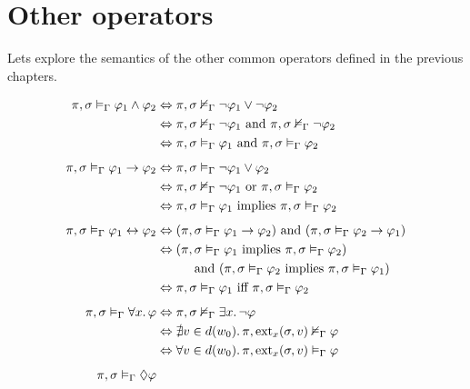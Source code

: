 \section{Other operators}
Lets explore the semantics of the other common operators defined in the previous chapters.

\begin{align}
  \sem{\pi}{\sigma}{\Gamma}{\phi_1 \land \phi_2}
    &\Leftrightarrow \semn{\pi}{\sigma}{\Gamma}{\neg\phi_1 \lor \neg\phi_2} \notag \\
    &\Leftrightarrow \semn{\pi}{\sigma}{\Gamma}{\neg\phi_1} \text{ and } \semn{\pi}{\sigma}{\Gamma}{\neg\phi_2} \notag \\
    &\Leftrightarrow \sem{\pi}{\sigma}{\Gamma}{\phi_1} \text{ and } \sem{\pi}{\sigma}{\Gamma}{\phi_2} \label{eq:andsem} \\[1ex]
  \sem{\pi}{\sigma}{\Gamma}{\phi_1 \to \phi_2}
    &\Leftrightarrow \sem{\pi}{\sigma}{\Gamma}{\neg\phi_1 \lor \phi_2} \notag \\
    &\Leftrightarrow \semn{\pi}{\sigma}{\Gamma}{\neg\phi_1} \text{ or } \sem{\pi}{\sigma}{\Gamma}{\phi_2} \notag \\
    &\Leftrightarrow \sem{\pi}{\sigma}{\Gamma}{\phi_1} \text{ implies } \sem{\pi}{\sigma}{\Gamma}{\phi_2} \label{eq:impliessem} \\[1ex]
  \sem{\pi}{\sigma}{\Gamma}{\phi_1 \leftrightarrow \phi_2}
    &\Leftrightarrow (\sem{\pi}{\sigma}{\Gamma}{\phi_1 \to \phi_2}) \text{ and } (\sem{\pi}{\sigma}{\Gamma}{\phi_2 \to \phi_1}) \notag \\
    &\Leftrightarrow (\sem{\pi}{\sigma}{\Gamma}{\phi_1} \text{ implies } \sem{\pi}{\sigma}{\Gamma}{\phi_2}) \notag \\
        &\qquad\quad\text{and } (\sem{\pi}{\sigma}{\Gamma}{\phi_2} \text{ implies } \sem{\pi}{\sigma}{\Gamma}{\phi_1}) \notag \\
    &\Leftrightarrow \sem{\pi}{\sigma}{\Gamma}{\phi_1} \text{ iff } \sem{\pi}{\sigma}{\Gamma}{\phi_2} \label{eq:iffsem} \\[1ex]
  \sem{\pi}{\sigma}{\Gamma}{\foralls{x}{\phi}}
    &\Leftrightarrow \semn{\pi}{\sigma}{\Gamma}{\existss{x}{\neg\phi}} \notag \\
    &\Leftrightarrow \nexists v \in d(w_0) \ldotp \semn{\pi}{\extend_x(\sigma, v)}{\Gamma}{\phi} \notag \\
    &\Leftrightarrow \foralls{v \in d(w_0)}{\sem{\pi}{\extend_x(\sigma, v)}{\Gamma}{\phi}} \label{eq:forallsem} \\[1ex]
  \sem{\pi}{\sigma}{\Gamma}{\eventually{\phi}}

\end{align}
